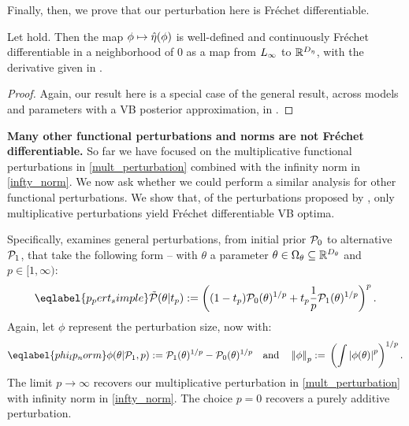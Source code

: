 Finally, then, we prove that our perturbation here is Fr{\'e}chet differentiable.
\begin{thm}
%
Let  hold.
%
%
Then the map $\phi \mapsto \hat\eta(\phi)$ is well-defined and continuously
Fr{\'e}chet differentiable in a neighborhood of $0$ as a map from ${L_{\infty}}$ to
$\mathbb{R}^{D_{\eta}}$, with the derivative given in .
\end{thm}
%
\begin{proof}
%
Again, our result here is a special case of the general result, across models
and parameters with a VB posterior approximation, in .
%
\end{proof}

\noindent \textbf{Many other functional perturbations and norms are not Fr{\'e}chet differentiable.}
%
So far we have focused on the multiplicative functional perturbations in \eqref{mult_perturbation} combined with the infinity
norm in \eqref{infty_norm}. We now ask whether we could perform a similar analysis for other functional perturbations. We show that, of the perturbations proposed by \citet{gustafson:1996:local}, only
multiplicative perturbations yield Fr{\'e}chet
differentiable VB optima.

Specifically, \citet{gustafson:1996:local} examines general perturbations, from initial prior
$\mathcal{P}_{0}$ to alternative $\mathcal{P}_{1}$, that take the following form -- with $\theta$ a parameter $\theta \in \Omega_{\theta} \subseteq \mathbb{R}^{{D_{\theta}}}$ and $p \in [1, \infty)$:
%
\begin{align}\eqlabel{p_pert_simple}
%
\ptil(\theta \vert \tp) :=
    \left((1 - \tp)\pbase(\theta)^{1/p} +
    \tp \frac{1}{p}\palt(\theta)^{1/p} \right)^{p}.
%
\end{align}
%
Again, let $\phi$ represent the perturbation size, now with:
%
\begin{align}\eqlabel{phi_lp_norm}
%
\phi(\theta \vert \palt, p) :={}
    \palt(\theta)^{1/p} - \pbase(\theta)^{1/p} \mathand
\norm{\phi}_p :={} \left(\int \abs{\phi(\theta)}^p \right)^{1/p}.
%
\end{align}
%
The limit $p \rightarrow \infty$ recovers our multiplicative perturbation in \eqref{mult_perturbation}
with infinity norm in \eqref{infty_norm}. The choice $p=0$ recovers a purely additive perturbation.

